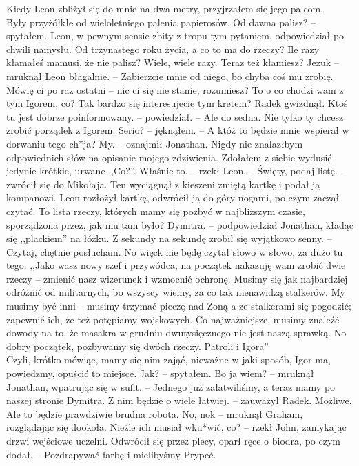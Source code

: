 \documentclass[../MAIN.tex]{subfiles}
\begin{document}
Kiedy Leon zbliżył się do mnie na dwa metry, przyjrzałem się jego palcom.\\
Były przyżółkłe od wieloletniego palenia papierosów.
\sx Od dawna palisz? -- spytałem. Leon, w pewnym sensie zbity z tropu tym pytaniem, odpowiedział po chwili namysłu.
\xx Od trzynastego roku życia, a co to ma do rzeczy?
\xx Ile razy kłamałeś mamusi, że nie palisz?
\xx Wiele, wiele razy.
\xx Teraz też kłamiesz?
\xx Jezu\3k -- mruknął Leon błagalnie. -- Zabierzcie mnie od niego, bo chyba coś mu zrobię. Mówię ci po raz ostatni -- nic ci się nie stanie, rozumiesz?
\xx To o co chodzi wam z tym Igorem, co? Tak bardzo się interesujecie tym kretem?
\qd
Radek gwizdnął.
\sx Ktoś tu jest dobrze poinformowany. -- powiedział. -- Ale do sedna. Nie tylko ty chcesz zrobić porządek z Igorem.
\xx Serio? -- jęknąłem. -- A któż to będzie mnie wspierał w dorwaniu tego ch*ja?
\xx My. -- oznajmił Jonathan.
\qd
Nigdy nie znalazłbym odpowiednich słów na opisanie mojego zdziwienia. Zdołałem z siebie wydusić jedynie krótkie, urwane ,,Co?''.
\sx Właśnie to. -- rzekł Leon. -- Święty, podaj listę. -- zwrócił się do Mikołaja. Ten wyciągnął z kieszeni zmiętą kartkę i podał ją kompanowi.
\qd
Leon rozłożył kartkę, odwrócił ją do góry nogami, po czym zaczął czytać.
\sx To lista rzeczy, których mamy się pozbyć w najbliższym czasie, sporządzona przez, jak mu tam było?
\xx Dymitra. -- podpowiedział Jonathan, kładąc się ,,plackiem'' na łóżku. Z sekundy na sekundę zrobił się wyjątkowo senny. -- Czytaj, chętnie posłucham.
\xx No więc\3k nie będę czytał słowo w słowo, za dużo tu tego. ,,Jako wasz nowy szef i przywódca, na początek nakazuję wam zrobić dwie rzeczy -- zmienić nasz wizerunek i wzmocnić ochronę. Musimy się jak najbardziej odróżnić od militarnych, bo wszyscy wiemy, za co tak nienawidzą stalkerów. My musimy być inni -- musimy trzymać pieczę nad Zoną a ze stalkerami się pogodzić; zapewnić ich, że też potępiamy wojskowych. Co najważniejsze, musimy znaleźć dowody na to, że masakra w grudniu dwutysięcznego nie jest naszą sprawką. No dobry początek, pozbywamy się dwóch rzeczy. Patroli i Igora''\\
Czyli, krótko mówiąc, mamy się nim zająć, nieważne w jaki sposób, Igor ma, powiedzmy, opuścić to miejsce.
\xx Jak? -- spytałem.
\xx Bo ja wiem? -- mruknął Jonathan, wpatrując się w sufit. -- Jednego już załatwiliśmy, a teraz mamy po naszej stronie Dymitra.
\xx Z nim będzie o wiele łatwiej. -- zauważył Radek.
\xx Możliwe. Ale to będzie prawdziwie brudna robota.
\qd
% 
% 
\sx No, no\3k -- mruknął Graham, rozglądając się dookoła.
\xx Nieźle ich musiał wku*wić, co? -- rzekł John, zamykając drzwi wejściowe uczelni. Odwrócił się przez plecy, oparł ręce o biodra, po czym dodał. -- Pozdrapywać farbę i mielibyśmy Prypeć.
\end{document}
